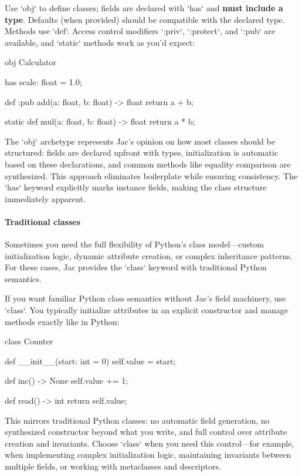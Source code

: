 Use `obj` to define classes; fields are declared with `has` and \textbf{must include a type}. Defaults (when provided) should be compatible with the declared type. Methods use `def`. Access control modifiers `:priv`, `:protect`, and `:pub` are available, and `static` methods work as you'd expect:

\begin{jacblock}
obj Calculator {
    has scale: float = 1.0;

    def :pub add(a: float, b: float) -> float {
        return a + b;
    }

    static def mul(a: float, b: float) -> float {
        return a * b;
    }
}
\end{jacblock}

The `obj` archetype represents Jac's opinion on how most classes should be structured: fields are declared upfront with types, initialization is automatic based on these declarations, and common methods like equality comparison are synthesized. This approach eliminates boilerplate while ensuring consistency. The `has` keyword explicitly marks instance fields, making the class structure immediately apparent.

\paragraph{Traditional classes}

Sometimes you need the full flexibility of Python's class model—custom initialization logic, dynamic attribute creation, or complex inheritance patterns. For these cases, Jac provides the `class` keyword with traditional Python semantics.

If you want familiar Python class semantics without Jac's field machinery, use `class`. You typically initialize attributes in an explicit constructor and manage methods exactly like in Python:

\begin{jacblock}
class Counter {
    def __init__(start: int = 0) {
        self.value = start;
    }

    def inc() -> None { self.value += 1; }

    def read() -> int { return self.value; }
}
\end{jacblock}

This mirrors traditional Python classes: no automatic field generation, no synthesized constructor beyond what you write, and full control over attribute creation and invariants. Choose `class` when you need this control—for example, when implementing complex initialization logic, maintaining invariants between multiple fields, or working with metaclasses and descriptors.

